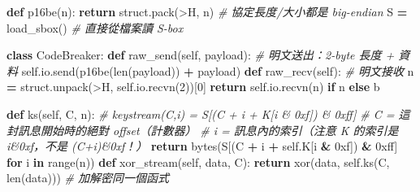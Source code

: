 \documentclass[10pt,a4paper]{article}
\newenvironment{Shaded}{\begin{snugshade}}{\end{snugshade}}
\newcommand{\BaseNTok}[1]{\textcolor[rgb]{0.00,0.00,0.81}{#1}}
\newcommand{\BuiltInTok}[1]{#1}
\newcommand{\CommentTok}[1]{\textcolor[rgb]{0.56,0.35,0.01}{\textit{#1}}}
\newcommand{\ControlFlowTok}[1]{\textcolor[rgb]{0.13,0.29,0.53}{\textbf{#1}}}
\newcommand{\DecValTok}[1]{\textcolor[rgb]{0.00,0.00,0.81}{#1}}
\newcommand{\KeywordTok}[1]{\textcolor[rgb]{0.13,0.29,0.53}{\textbf{#1}}}
\newcommand{\NormalTok}[1]{#1}
\newcommand{\OperatorTok}[1]{\textcolor[rgb]{0.81,0.36,0.00}{\textbf{#1}}}
\newcommand{\StringTok}[1]{\textcolor[rgb]{0.31,0.60,0.02}{#1}}
\newcommand{\VariableTok}[1]{\textcolor[rgb]{0.00,0.00,0.00}{#1}}
\renewenvironment{Shaded}{%
  \def\FrameCommand{\fboxsep=3.2pt\colorbox{shadecolor}}%
  \MakeFramed{\advance\hsize-\width\FrameRestore\small}%
}{%
  \endMakeFramed
}
\begin{document}
\begin{Shaded}
\begin{Highlighting}[]
\KeywordTok{def}\NormalTok{ p16be(n): }\ControlFlowTok{return}\NormalTok{ struct.pack(}\StringTok{\textquotesingle{}\textgreater{}H\textquotesingle{}}\NormalTok{, n)   }\CommentTok{\# 協定長度/大小都是 big{-}endian}
\NormalTok{S }\OperatorTok{=}\NormalTok{ load\_sbox()                             }\CommentTok{\# 直接從檔案讀 S{-}box}
\end{Highlighting}
\end{Shaded}

\begin{Shaded}
\begin{Highlighting}[]
\KeywordTok{class}\NormalTok{ CodeBreaker:}
    \KeywordTok{def}\NormalTok{ raw\_send(}\VariableTok{self}\NormalTok{, payload):            }\CommentTok{\# 明文送出：2{-}byte 長度 + 資料}
        \VariableTok{self}\NormalTok{.io.send(p16be(}\BuiltInTok{len}\NormalTok{(payload)) }\OperatorTok{+}\NormalTok{ payload)}
    \KeywordTok{def}\NormalTok{ raw\_recv(}\VariableTok{self}\NormalTok{):                     }\CommentTok{\# 明文接收}
\NormalTok{        n }\OperatorTok{=}\NormalTok{ struct.unpack(}\StringTok{\textquotesingle{}\textgreater{}H\textquotesingle{}}\NormalTok{, }\VariableTok{self}\NormalTok{.io.recvn(}\DecValTok{2}\NormalTok{))[}\DecValTok{0}\NormalTok{]}
        \ControlFlowTok{return} \VariableTok{self}\NormalTok{.io.recvn(n) }\ControlFlowTok{if}\NormalTok{ n }\ControlFlowTok{else} \StringTok{b\textquotesingle{}\textquotesingle{}}
\end{Highlighting}
\end{Shaded}

\begin{Shaded}
\begin{Highlighting}[]
    \KeywordTok{def}\NormalTok{ ks(}\VariableTok{self}\NormalTok{, C, n):}
        \CommentTok{\# keystream(C,i) = S[(C + i + K[i \& 0xf]) \& 0xff]}
        \CommentTok{\#   C = 這封訊息開始時的絕對 offset（計數器）}
        \CommentTok{\#   i = 訊息內的索引（注意 K 的索引是 i\&0xf，不是 (C+i)\&0xf！）}
        \ControlFlowTok{return} \BuiltInTok{bytes}\NormalTok{(S[(C }\OperatorTok{+}\NormalTok{ i }\OperatorTok{+} \VariableTok{self}\NormalTok{.K[i }\OperatorTok{\&} \BaseNTok{0xf}\NormalTok{]) }\OperatorTok{\&} \BaseNTok{0xff}\NormalTok{] }\ControlFlowTok{for}\NormalTok{ i }\KeywordTok{in} \BuiltInTok{range}\NormalTok{(n))}
    \KeywordTok{def}\NormalTok{ xor\_stream(}\VariableTok{self}\NormalTok{, data, C):}
        \ControlFlowTok{return}\NormalTok{ xor(data, }\VariableTok{self}\NormalTok{.ks(C, }\BuiltInTok{len}\NormalTok{(data)))   }\CommentTok{\# 加解密同一個函式}
\end{Highlighting}
\end{Shaded}
\end{document}
